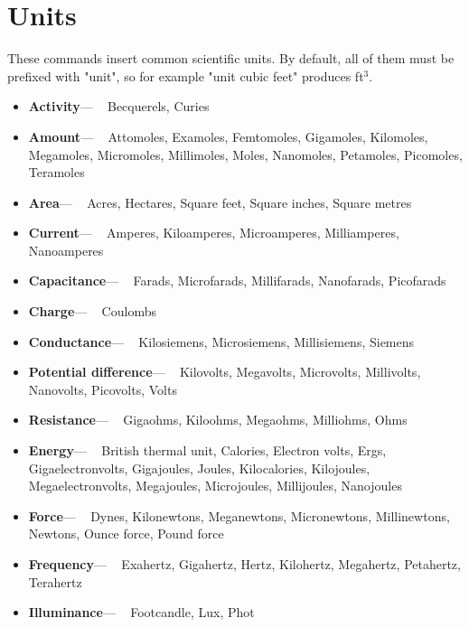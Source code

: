 \documentclass[12pt]{article}
\begin{document}
\section{Units}
These commands insert common scientific units. By default, all of them must be prefixed with "unit", so for example "unit cubic feet" produces ft$^{3}$.
\begin{itemize}
\item \textbf{Activity}--- ~
Becquerels,
Curies

\item \textbf{Amount}--- ~
Attomoles,
Examoles,
Femtomoles,
Gigamoles,
Kilomoles,
Megamoles,
Micromoles,
Millimoles,
Moles,
Nanomoles,
Petamoles,
Picomoles,
Teramoles

\item \textbf{Area}--- ~
Acres,
Hectares,
Square feet,
Square inches,
Square metres

\item \textbf{Current}--- ~
Amperes,
Kiloamperes,
Microamperes,
Milliamperes,
Nanoamperes

\item \textbf{Capacitance}--- ~
Farads,
Microfarads,
Millifarads,
Nanofarads,
Picofarads

\item \textbf{Charge}--- ~
Coulombs

\item \textbf{Conductance}--- ~
Kilosiemens,
Microsiemens,
Millisiemens,
Siemens

\item \textbf{Potential difference}--- ~
Kilovolts,
Megavolts,
Microvolts,
Millivolts,
Nanovolts,
Picovolts,
Volts

\item \textbf{Resistance}--- ~
Gigaohms,
Kiloohms,
Megaohms,
Milliohms,
Ohms

\item \textbf{Energy}--- ~
British thermal unit,
Calories,
Electron volts,
Ergs,
Gigaelectronvolts,
Gigajoules,
Joules,
Kilocalories,
Kilojoules,
Megaelectronvolts,
Megajoules,
Microjoules,
Millijoules,
Nanojoules

\item \textbf{Force}--- ~
Dynes,
Kilonewtons,
Meganewtons,
Micronewtons,
Millinewtons,
Newtons,
Ounce force,
Pound force

\item \textbf{Frequency}--- ~
Exahertz,
Gigahertz,
Hertz,
Kilohertz,
Megahertz,
Petahertz,
Terahertz

\item \textbf{Illuminance}--- ~
Footcandle,
Lux,
Phot


\end{itemize}
\end{document}
